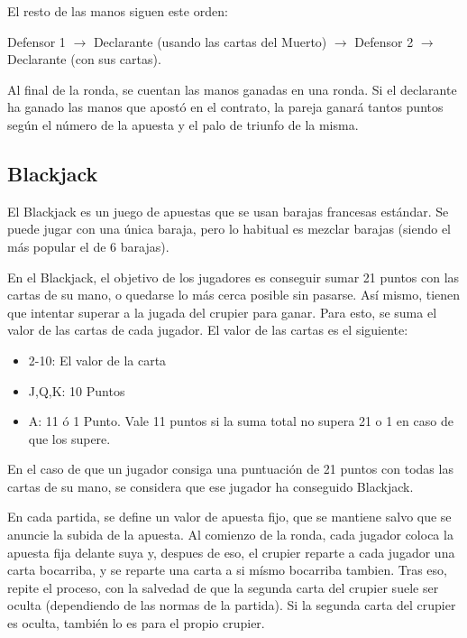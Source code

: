 El resto de las manos siguen este orden:

\begin{center}
 Defensor 1 $\rightarrow$ Declarante (usando las cartas del Muerto) $\rightarrow$ Defensor 2 $\rightarrow$ Declarante (con sus cartas).
\end{center}

Al final de la ronda, se cuentan las manos ganadas en una ronda. Si el declarante ha ganado las manos que apostó en el contrato, la pareja ganará tantos puntos según el número de la apuesta y el palo de triunfo de la misma.\cite{bridge}

\subsection{Blackjack}

El Blackjack \cite{blackjack} es un juego de apuestas que se usan barajas francesas estándar. Se puede jugar con una única baraja, pero lo habitual es mezclar barajas (siendo el más popular el de 6 barajas). 

En el Blackjack, el objetivo de los jugadores es conseguir sumar 21 puntos con las cartas de su mano, o quedarse lo más cerca posible sin pasarse. Así mismo, tienen que intentar superar a la jugada del crupier para ganar. Para esto, se suma el valor de las cartas de cada jugador. El valor de las cartas es el siguiente:
\begin{itemize}
\item 2-10: El valor de la carta
\item J,Q,K: 10 Puntos
\item A: 11 ó 1 Punto. Vale 11 puntos si la suma total no supera 21 o 1 en caso de que los supere.
\end{itemize} 

En el caso de que un jugador consiga una puntuación de 21 puntos con todas las cartas de su mano, se considera que ese jugador ha conseguido Blackjack.

En cada partida, se define un valor de apuesta fijo, que se mantiene salvo que se anuncie la subida de la apuesta. 
Al comienzo de la ronda, cada jugador coloca la apuesta fija delante suya y, despues de eso, el crupier reparte a cada jugador una carta bocarriba, y se reparte una carta a si mísmo bocarriba tambien. Tras eso, repite el proceso, con la salvedad de que la segunda carta del crupier suele ser oculta (dependiendo de las normas de la partida). Si la segunda carta del crupier es oculta, también lo es para el propio crupier.

